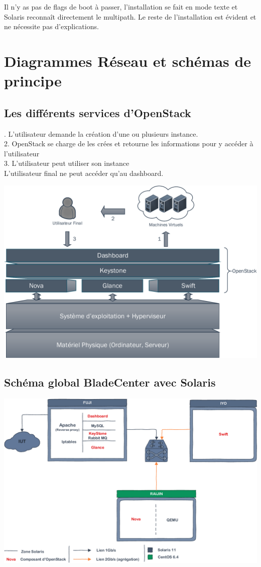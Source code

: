 \documentclass[a4paper,oneside]{report}
\begin{document}
Il n'y as pas de flags de boot à passer, l'installation se fait en mode texte et Solaris reconnaît directement le multipath.\newline
Le reste de l'installation est évident et ne nécessite pas d'explications.

\chapter{Diagrammes Réseau et schémas de principe}
\section{Les différents services d'OpenStack}
. L'utilisateur demande la création d'une ou plusieurs instance.\\
2. OpenStack se charge de les crées et retourne les informations pour y accéder à l'utilisateur\\
3. L'utilisateur peut utiliser son instance\\
L'utilisateur final ne peut accéder qu'au dashboard.
\begin{center}
\includegraphics[scale=0.8,angle=90]{images/principeOpenStack-crop.pdf}
\end{center}
\section{Schéma global BladeCenter avec Solaris} \label{sch:glob}
\begin{center}
\includegraphics[scale=0.8,angle=90]{images/topoBladeSolaris-crop.pdf}
\end{center}
\end{document}
